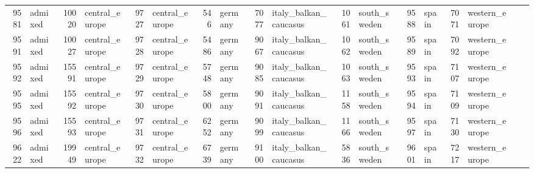 \begin{table}[h]
{\begin{tabular}{rl|rl|rl|rl|rl|rl|rl|rl|rl}
			9581                   & admixed         & 10020                  & central\_europe & 9727                   & central\_europe & 546                    & germany         & 7077                   & italy\_balkan\_caucasus & 1061                   & south\_sweden           & 9588                   & spain           & 7071                   & western\_europe &                          &                 \\
			9591                   & admixed         & 10027                  & central\_europe & 9728                   & central\_europe & 5486                   & germany         & 9067                   & italy\_balkan\_caucasus & 1062                   & south\_sweden           & 9589                   & spain           & 7092                   & western\_europe &                          &                 \\
			9592                   & admixed         & 15591                  & central\_europe & 9729                   & central\_europe & 5748                   & germany         & 9085                   & italy\_balkan\_caucasus & 1063                   & south\_sweden           & 9593                   & spain           & 7107                   & western\_europe &                          &                 \\
			9595                   & admixed         & 15592                  & central\_europe & 9730                   & central\_europe & 5800                   & germany         & 9091                   & italy\_balkan\_caucasus & 1158                   & south\_sweden           & 9594                   & spain           & 7109                   & western\_europe &                          &                 \\
			9596                   & admixed         & 15593                  & central\_europe & 9731                   & central\_europe & 6252                   & germany         & 9099                   & italy\_balkan\_caucasus & 1166                   & south\_sweden           & 9597                   & spain           & 7130                   & western\_europe &                          &                 \\
			9622                   & admixed         & 19949                  & central\_europe & 9732                   & central\_europe & 6739                   & germany         & 9100                   & italy\_balkan\_caucasus & 5836                   & south\_sweden           & 9601                   & spain           & 7217                   & western\_europe &                          &                 \\

\end{tabular}}
\end{table}
